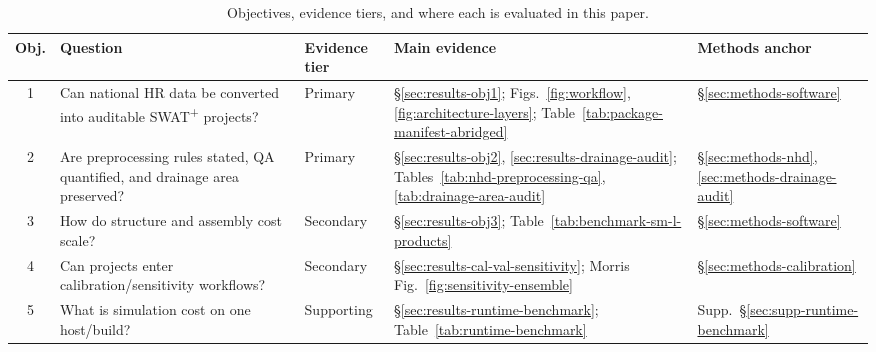 \begin{table}[htbp]
  \centering
  \caption{Objectives, evidence tiers, and where each is evaluated in this paper.}
  \label{tab:objective-evidence-map}
  \footnotesize
  \setlength{\tabcolsep}{3pt}
  \renewcommand{\arraystretch}{1.12}
  \begin{tabular}{@{}clp{2.0cm}p{3.2cm}p{2.4cm}@{}}
    \toprule
    Obj. & Question & Evidence tier & Main evidence & Methods anchor \\
    \midrule
    1 & Can national HR data be converted into auditable SWAT\textsuperscript{+} projects? & Primary & \S\ref{sec:results-obj1}; Figs.~\ref{fig:workflow}, \ref{fig:architecture-layers}; Table~\ref{tab:package-manifest-abridged} & \S\ref{sec:methods-software} \\
    2 & Are preprocessing rules stated, QA quantified, and drainage area preserved? & Primary & \S\ref{sec:results-obj2}, \ref{sec:results-drainage-audit}; Tables~\ref{tab:nhd-preprocessing-qa}, \ref{tab:drainage-area-audit} & \S\ref{sec:methods-nhd}, \ref{sec:methods-drainage-audit} \\
    3 & How do structure and assembly cost scale? & Secondary & \S\ref{sec:results-obj3}; Table~\ref{tab:benchmark-sm-l-products} & \S\ref{sec:methods-software} \\
    4 & Can projects enter calibration/sensitivity workflows? & Secondary & \S\ref{sec:results-cal-val-sensitivity}; Morris Fig.~\ref{fig:sensitivity-ensemble} & \S\ref{sec:methods-calibration} \\
    5 & What is simulation cost on one host/build? & Supporting & \S\ref{sec:results-runtime-benchmark}; Table~\ref{tab:runtime-benchmark} & Supp.~\S\ref{sec:supp-runtime-benchmark} \\
    \bottomrule
  \end{tabular}
\end{table}
